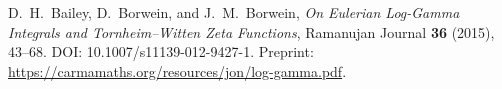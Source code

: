 D.~H.~Bailey, D.~Borwein, and J.~M.~Borwein,
\emph{On Eulerian Log-Gamma Integrals and Tornheim--Witten Zeta Functions},
Ramanujan Journal \textbf{36} (2015), 43--68.
DOI: 10.1007/s11139-012-9427-1.
Preprint: \url{https://carmamaths.org/resources/jon/log-gamma.pdf}.
